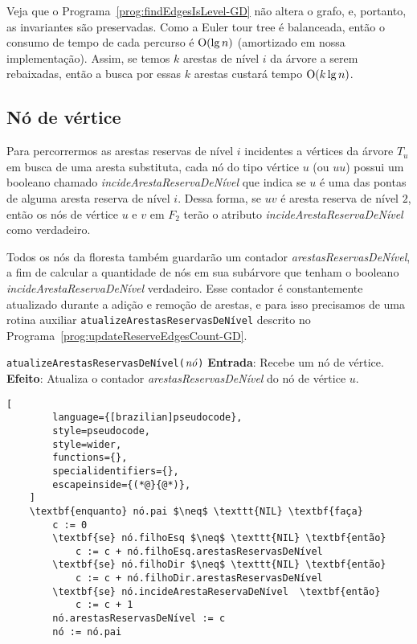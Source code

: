 Veja que o Programa~\ref{prog:findEdgesIsLevel-GD} não altera o grafo, e, portanto, as invariantes são preservadas. Como a Euler tour tree é balanceada, então o consumo de tempo de cada percurso é $\mathrm{O}(\lg n)$ (amortizado em nossa implementação). Assim, se temos $k$ arestas de nível $i$ da árvore a serem rebaixadas, então a busca por essas $k$ arestas custará tempo $\mathrm{O}(k \lg n)$.

\subsection{Nó de vértice}
\label{sec:node-vertex}

Para percorrermos as arestas reservas de nível $i$ incidentes a vértices da árvore $T_u$ em busca de uma aresta substituta, cada nó do tipo vértice $u$ (ou $uu$) possui um booleano chamado \textit{incideArestaReservaDeNível} que indica se $u$ é uma das pontas de alguma aresta reserva de nível $i$. Dessa forma, se $uv$ é aresta reserva de nível $2$, então os nós de vértice $u$ e $v$ em $F_2$ terão o atributo \textit{incideArestaReservaDeNível} como verdadeiro. 

Todos os nós da floresta também guardarão um contador \textit{arestasReservasDeNível}, a fim de calcular a quantidade de nós em sua subárvore que tenham o booleano \textit{incideArestaReservaDeNível} verdadeiro. Esse contador é constantemente atualizado durante a adição e remoção de arestas, e para isso precisamos de uma rotina auxiliar \texttt{atualizeArestasReservasDeNível} descrito no Programa~\ref{prog:updateReserveEdgesCount-GD}. 

\begin{programruledcaption}{\texttt{atualizeArestasReservasDeNível($\emph{nó}$)} \label{prog:updateReserveEdgesCount-GD}}
    \noindent\textbf{Entrada}: Recebe um nó de vértice.
    \\
    \noindent\textbf{Efeito}: Atualiza o contador \textit{arestasReservasDeNível} do nó de vértice $u$.
    \vspace{-0.5\baselineskip}
    \begin{lstlisting}[
        language={[brazilian]pseudocode},
        style=pseudocode,
        style=wider,
        functions={},
        specialidentifiers={},
        escapeinside={(*@}{@*)},
    ]
    \textbf{enquanto} nó.pai $\neq$ \texttt{NIL} \textbf{faça}
        c := 0
        \textbf{se} nó.filhoEsq $\neq$ \texttt{NIL} \textbf{então}
            c := c + nó.filhoEsq.arestasReservasDeNível
        \textbf{se} nó.filhoDir $\neq$ \texttt{NIL} \textbf{então}
            c := c + nó.filhoDir.arestasReservasDeNível
        \textbf{se} nó.incideArestaReservaDeNível  \textbf{então}
            c := c + 1
        nó.arestasReservasDeNível := c
        nó := nó.pai
    \end{lstlisting}
    \vspace{-0.5\baselineskip}
\end{programruledcaption}

